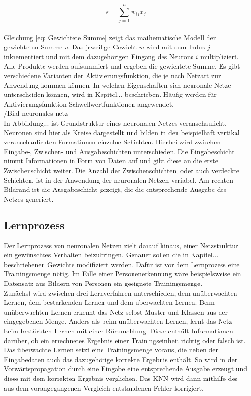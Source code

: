 		\begin{equation}
		s=\sum_{j=1}^n w_{ij}x_j
		\label{eq: Gewichtete Summe}
		\end{equation}
		\\
		
		Gleichung \ref{eq: Gewichtete Summe} zeigt das mathematische Modell der gewichteten Summe $s$. Das jeweilige Gewicht $w$ wird mit dem Index $j$ inkrementiert und mit dem dazugehörigen Eingang des Neurons $i$ multipliziert. Alle Produkte werden aufsummiert und ergeben die gewichtete Summe. Es gibt verschiedene Varianten der Aktivierungsfunktion, die je nach Netzart zur Anwendung kommen können. In welchen Eigenschaften sich neuronale Netze unterscheiden können, wird in Kapitel... beschrieben. Häufig werden für Aktivierungsfunktion Schwellwertfunktionen angewendet. \\
		
		/Bild neuronales netz
		\\
		
		In Abbildung... ist Grundstruktur eines neuronalen Netzes veranschaulicht. Neuronen sind hier als Kreise dargestellt und bilden in den beispielhaft vertikal veranschaulichten Formationen einzelne Schichten. Hierbei wird zwischen Eingabe-, Zwischen- und Ausgabeschichten unterschieden. Die Eingabeschicht nimmt Informationen in Form von Daten auf und gibt diese an die erste Zwischenschicht weiter. Die Anzahl der Zwischenschichten, oder auch verdeckte Schichten, ist in der Anwendung der neuronalen Netzen variabel. Am rechten Bildrand ist die Ausgabeschicht gezeigt, die die entsprechende Ausgabe des Netzes generiert.  
	
		\subsection{Lernprozess}
		Der Lernprozess von neuronalen Netzen zielt darauf hinaus, einer Netzstruktur ein gewünschtes Verhalten beizubringen. Genauer sollen die in Kapitel... beschriebenen Gewichte modifiziert werden. Dafür ist vor dem Lernprozess eine Trainingsmenge nötig. Im Falle einer Personenerkennung wäre beispielsweise ein Datensatz aus Bildern von Personen ein geeignete Trainingsmenge.\\
		
		Zunächst wird zwischen drei Lernverfahren unterschieden, dem unüberwachten Lernen, dem bestärkenden Lernen und dem überwachten Lernen. Beim unüberwachten Lernen erkennt das Netz selbst Muster und Klassen aus der eingegebenen Menge. Anders als beim unüberwachten Lernen, lernt das Netz beim bestärkten Lernen mit einer Rückmeldung. Diese enthält Informationen darüber, ob ein errechnetes Ergebnis einer Trainingseinheit richtig oder falsch ist. Das überwachte Lernen setzt eine Trainingsmenge voraus, die neben der Eingabedaten auch das dazugehörige korrekte Ergebnis enthält. So wird in der Vorwärtspropagation durch eine Eingabe eine entsprechende Ausgabe erzeugt und diese mit dem korrekten Ergebnis verglichen. Das KNN wird dann mithilfe des aus dem vorangegangenen Vergleich entstandenen Fehler korrigiert.\cite{Kriesel}\\
		
